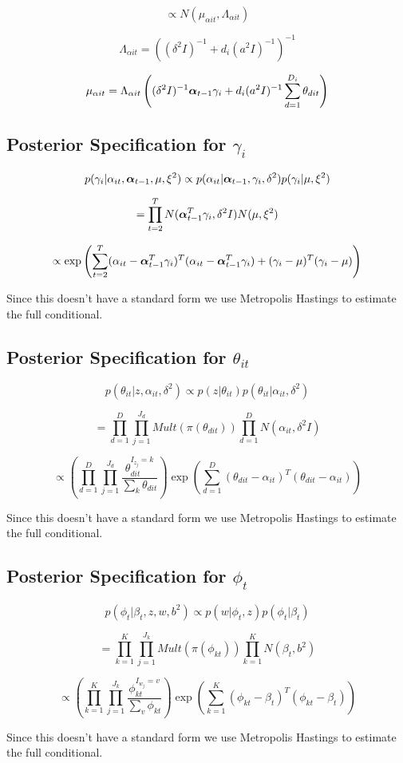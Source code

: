 \documentclass[a4paper]{article}
\begin{document}
\[\propto N(\mu_{\alpha i t}, \Lambda_{\alpha i t})\]

\[\Lambda_{\alpha i t} = ((\delta^2I)^{-1} + d_i (a^2I)^{-1})^{-1}\]

\[\mu_{\alpha i t} = \Lambda_{\alpha i t} \left((\delta^2I)^{-1}\text{\boldmath$\alpha$}_{t-1} \gamma_i + d_i (a^2I)^{-1} \sum_{d=1}^{D_i} \theta_{dit}\right) \]

\subsection{Posterior Specification for $\gamma_i$}

\[p(\gamma_i | \alpha_{it}, \text{\boldmath$\alpha$}_{t-1}, \mu, \xi^2) \propto p(\alpha_{it} | \text{\boldmath$\alpha$}_{t-1}, \gamma_i, \delta^2) p(\gamma_i | \mu, \xi^2)\]

\[= \prod_{t=2}^T N(\text{\boldmath$\alpha$}_{t-1}^T \gamma_i, \delta^2I)N(\mu, \xi^2)\]

\[\propto \exp{\left(\sum_{t=2}^T(\alpha_{it} - \text{\boldmath$\alpha$}_{t-1}^T \gamma_i)^T(\alpha_{it} - \text{\boldmath$\alpha$}_{t-1}^T \gamma_i) + (\gamma_i - \mu)^T(\gamma_i - \mu)\right)}\]

Since this doesn't have a standard form we use Metropolis Hastings to estimate the full conditional.

\subsection{Posterior Specification for $\theta_{it}$}

\[p(\theta_{it} | z, \alpha_{it}, \delta^2) \propto p(z | \theta_{it}) p(\theta_{it} | \alpha_{it}, \delta^2)\]

\[= \prod_{d=1}^D \prod_{j=1}^{J_d} Mult(\pi(\theta_{dit}))\prod_{d=1}^D N(\alpha_{it}, \delta^2I)\]

\[\propto \left(\prod_{d=1}^D \prod_{j=1}^{J_d} \frac{\theta_{dit}^{I_{z_j}=k}}{\sum_k \theta_{dit}}\right) \exp{\left(\sum_{d=1}^D(\theta_{dit} - \alpha_{it})^T(\theta_{dit} - \alpha_{it})\right)} \]

Since this doesn't have a standard form we use Metropolis Hastings to estimate the full conditional.

\subsection{Posterior Specification for $\phi_t$}

\[p(\phi_t | \beta_t, z, w, b^2) \propto p(w | \phi_t, z) p(\phi_t | \beta_t)\]

\[= \prod_{k=1}^K \prod_{j=1}^{J_k} Mult(\pi(\phi_{kt}))\prod_{k=1}^K N(\beta_t, b^2)\]

\[\propto \left(\prod_{k=1}^K \prod_{j=1}^{J_k} \frac{\phi_{kt}^{I_{w_j}=v}}{\sum_v \phi_{kt}}\right) \exp{\left(\sum_{k=1}^K(\phi_{kt} - \beta_t)^T(\phi_{kt} - \beta_t)\right)}\]

Since this doesn't have a standard form we use Metropolis Hastings to estimate the full conditional.
\end{document}
